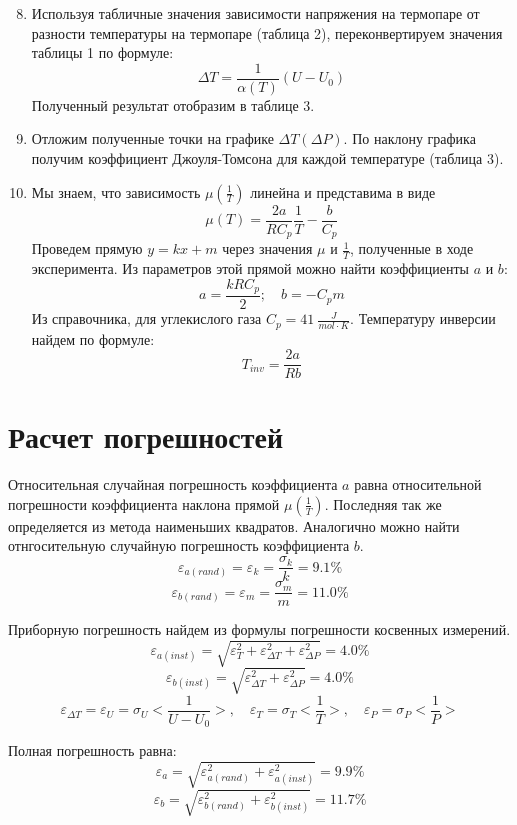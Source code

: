 \documentclass[14pt, a4paper]{report}
\begin{document}
\begin{enumerate}
\setcounter{enumi}{7}

\item Используя табличные значения зависимости напряжения на термопаре от разности температуры на термопаре (таблица 2), переконвертируем значения таблицы 1 по формуле:
\[\Delta T=\frac{1}{\alpha(T)}(U-U_0)\]
Полученный результат отобразим в таблице 3.

\item Отложим полученные точки на графике $\Delta T (\Delta P)$. По наклону графика получим коэффициент Джоуля-Томсона для каждой температуре (таблица 3).

\item Мы знаем, что зависимость $\mu(\frac{1}{T})$ линейна и представима в виде
\[\mu(T)=\frac{2a}{RC_p}\frac{1}{T}-\frac{b}{C_p}\]
Проведем прямую $y=kx+m$ через значения $\mu$ и $\frac{1}{T}$, полученные в ходе эксперимента. Из параметров этой прямой можно найти коэффициенты $a$ и $b$:
\[a=\frac{kRC_p}{2};\quad b=-C_pm\]
Из справочника, для углекислого газа $C_p=41\ \frac{J}{mol\cdot K}$.
Температуру инверсии найдем по формуле:
\[T_{inv}=\frac{2a}{Rb}\]


\end{enumerate}

\section{Расчет погрешностей}

Относительная случайная погрешность коэффициента $a$ равна относительной погрешности коэффициента наклона прямой $\mu(\frac{1}{T})$. Последняя так же определяется из метода наименьших квадратов. Аналогично можно найти отнгосительную случайную погрешность коэффициента $b$.
\[\varepsilon_{a(rand)}=\varepsilon_k=\frac{\sigma_k}{k}=9.1\%\]
\[\varepsilon_{b(rand)}=\varepsilon_m=\frac{\sigma_m}{m}=11.0\%\]

Приборную погрешность найдем из формулы погрешности косвенных измерений.
\[\varepsilon_{a(inst)}=\sqrt{\varepsilon_T^2+\varepsilon_{\Delta T}^2+\varepsilon_{\Delta P}^2}=4.0\%\]
\[\varepsilon_{b(inst)}=\sqrt{\varepsilon_{\Delta T}^2+\varepsilon_{\Delta P}^2}=4.0\%\]
\[\varepsilon_{\Delta T}=\varepsilon_U=\sigma_U<\frac{1}{U-U_0}>,\quad \varepsilon_T=\sigma_T<\frac{1}{T}>, \quad \varepsilon_P=\sigma_P<\frac{1}{P}>\]

Полная погрешность равна:
\[\varepsilon_a=\sqrt{\varepsilon_{a(rand)}^2+\varepsilon_{a(inst)}^2}=9.9\%\]
\[\varepsilon_b=\sqrt{\varepsilon_{b(rand)}^2+\varepsilon_{b(inst)}^2}=11.7\%\]
\end{document}
